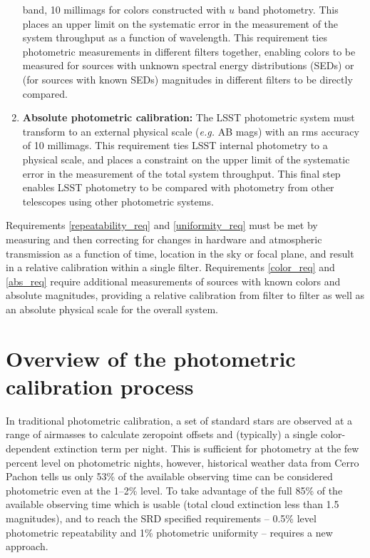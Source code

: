 \documentclass[12pt,preprint]{aastex}
\begin{document}
\begin{enumerate}
{band, 10 millimags for colors constructed with $u$ band
photometry. This places an upper limit on the systematic error in
the measurement of the system throughput as a function of
wavelength. This requirement ties photometric measurements in
different filters together, enabling colors to be measured for sources
with unknown spectral energy distributions (SEDs) or (for sources with known SEDs) magnitudes in
different filters to be directly compared. \label{color_req}}
\item{{\bf Absolute photometric calibration:} The LSST photometric
system must transform to an external physical scale ({\it e.g.} AB
mags) with an rms accuracy of 10 millimags. This requirement ties LSST internal
photometry to a physical scale, and places a constraint on the upper
limit of the systematic error in the measurement of the total system
throughput. This final step enables LSST photometry to be compared
with photometry from other telescopes using other photometric
systems. \label{abs_req}}
\end{enumerate}

Requirements \ref{repeatability_req} and \ref{uniformity_req} must be
met by measuring and then correcting for changes in hardware and
atmospheric transmission as a function of time, location in the sky or
focal plane, and result in a relative calibration within a single
filter. Requirements \ref{color_req} and \ref{abs_req} require
additional measurements of sources with known colors and absolute
magnitudes, providing a relative calibration from filter to filter as
well as an absolute physical scale for the overall system.


\section{Overview of the photometric calibration process}
\label{sec:calib_overview}

In traditional photometric calibration, a set of standard stars are
observed at a range of airmasses to calculate zeropoint offsets and
(typically) a single color-dependent extinction term per night. This is
sufficient for photometry at the few percent level on photometric
nights, however, historical weather data from Cerro Pachon tells us
only 53\% of the available observing time can be considered
photometric even at the 1--2\% level. To take advantage of the full
85\% of the available observing time which is usable (total cloud
extinction less than 1.5 magnitudes), and to reach the SRD specified
requirements -- 0.5\% level photometric repeatability and 1\%
photometric uniformity -- requires a new approach.
\end{document}
